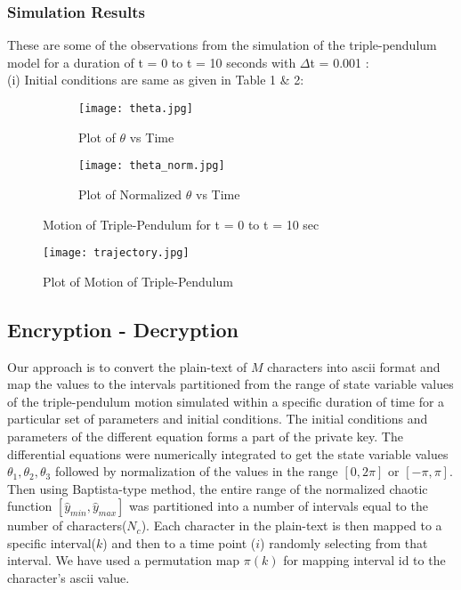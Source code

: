 \subsubsection{Simulation Results}
These are some of the observations from the simulation of the triple-pendulum model for a duration of t = 0 to t = 10 seconds with $\Delta$t = 0.001 :\\
(i) Initial conditions are same as given in Table 1 \& 2:\\
 
\begin{figure}[H]
\begin{subfigure}{0.5\textwidth}
\texttt{[image: theta.jpg]}
\caption{Plot of ${\theta}$ vs Time}\label{fig:theta}
\end{subfigure}
\begin{subfigure}{0.5\textwidth}
\texttt{[image: theta\_norm.jpg]}
\caption{Plot of Normalized ${\theta}$ vs Time}\label{fig:theta_norm}
\end{subfigure}
\caption{Motion of Triple-Pendulum for t = 0 to t = 10 sec}\label{fig:image3}
\end{figure}

\begin{figure}[H]
\centering
\texttt{[image: trajectory.jpg]}
\caption{Plot of Motion of Triple-Pendulum}\label{fig:trajectory}
\end{figure}


\subsection{Encryption - Decryption}
Our approach is to convert the plain-text of $M$ characters into ascii format and  map the values to the intervals partitioned from the range of state variable values of the triple-pendulum motion simulated within a specific duration of time for a particular set of parameters and initial conditions. The initial conditions and parameters of the different equation forms a part of the private key. The differential equations were numerically integrated to get the state variable values $\theta_{1},\theta_{2},\theta_{3}$ followed by normalization of the values in the range $[0,2\pi]$ or $[-\pi,\pi]$. Then using Baptista-type method, the entire range of the normalized chaotic function $[\hat{y}_{min},\hat{y}_{max}]$ was partitioned into a number of intervals equal to the number of characters($N_{c}$). Each character in the plain-text is then mapped to a specific interval($k$) and then to a time point ($i$) randomly selecting from that interval. We have used a permutation map $\pi(k)$ for mapping interval id to the character's ascii value.

